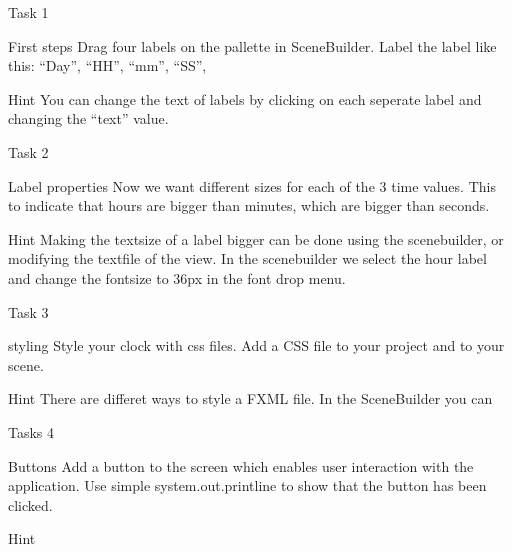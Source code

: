 
\begin{frame}{Task 1}
\begin{block}{First steps}
Drag four labels on the pallette in SceneBuilder. Label the label like  this: “Day”, “HH”, “mm”, “SS”, 
\end{block}
\pause
\begin{exampleblock}{Hint}
You can change the text of labels by clicking on each seperate label and changing the “text” value.  
\end{exampleblock}
\end{frame}
\begin{frame}{Task 2}
\begin{block}{Label properties}
Now we want different sizes for each of the 3 time values. This to indicate that hours are bigger than minutes, which are bigger than seconds. 
\end{block}
\pause
\begin{exampleblock}{Hint}
Making the textsize of a label bigger can be done using the scenebuilder, or modifying the textfile of the view. In the scenebuilder we select the hour label and change the fontsize to 36px in the font drop menu.
\end{exampleblock}
\end{frame}
\begin{frame}{Task 3}
\begin{block}{styling}
Style your clock with css files. Add a CSS file to your project and to your scene.
\end{block}
\pause
\begin{exampleblock}{Hint}
There are differet ways to style a FXML file. In the SceneBuilder you can

\end{exampleblock}
\end{frame}
\begin{frame}{Tasks 4}
\begin{block}{Buttons}
Add a button to the screen which enables user interaction with the 
application. Use simple system.out.printline to show that the button has been clicked. 
\end{block}
\pause
\begin{exampleblock}{Hint}

\end{exampleblock}
\end{frame}